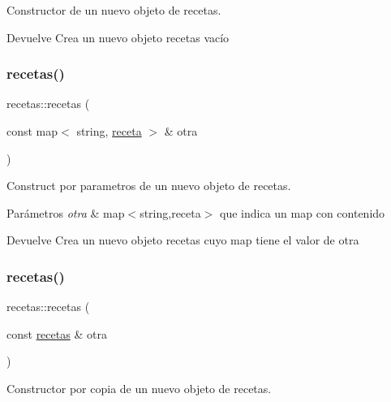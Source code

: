 Constructor de un nuevo objeto de recetas. 

\begin{DoxyReturn}{Devuelve}
Crea un nuevo objeto recetas vacío 
\end{DoxyReturn}
\mbox{\label{classrecetas_ac59d36c24e824aa0a00d888466fecc06}} 
\subsubsection{\texorpdfstring{recetas()}{recetas()}\hspace{0.1cm}{\footnotesize\ttfamily [2/3]}}
{\footnotesize\ttfamily recetas\+::recetas (\begin{DoxyParamCaption}\item[{const map$<$ string, \hyperlink{classreceta}{receta} $>$ \&}]{otra }\end{DoxyParamCaption})}



Construct por parametros de un nuevo objeto de recetas. 


\begin{DoxyParams}{Parámetros}
{\em otra} & map$<$string,receta$>$ que indica un map con contenido \\
\hline
\end{DoxyParams}
\begin{DoxyReturn}{Devuelve}
Crea un nuevo objeto recetas cuyo map tiene el valor de otra 
\end{DoxyReturn}
\mbox{\label{classrecetas_a7e071e6d0aab97f7810c3c987b5b89cc}} 
\subsubsection{\texorpdfstring{recetas()}{recetas()}\hspace{0.1cm}{\footnotesize\ttfamily [3/3]}}
{\footnotesize\ttfamily recetas\+::recetas (\begin{DoxyParamCaption}\item[{const \hyperlink{classrecetas}{recetas} \&}]{otra }\end{DoxyParamCaption})}



Constructor por copia de un nuevo objeto de recetas. 



